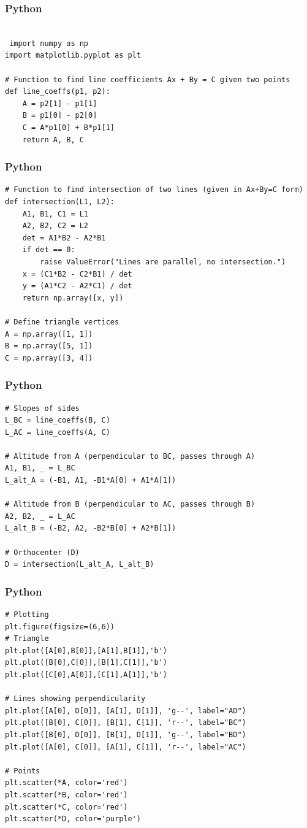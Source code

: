 \documentclass{beamer}
\begin{document}
\begin{frame}[fragile]
    \frametitle{Python}
    \begin{lstlisting}

 import numpy as np
import matplotlib.pyplot as plt

# Function to find line coefficients Ax + By = C given two points
def line_coeffs(p1, p2):
    A = p2[1] - p1[1]
    B = p1[0] - p2[0]
    C = A*p1[0] + B*p1[1]
    return A, B, C
\end{lstlisting}
 
\end{frame}
\begin{frame}[fragile]
    \frametitle{Python}
    \begin{lstlisting}
# Function to find intersection of two lines (given in Ax+By=C form)
def intersection(L1, L2):
    A1, B1, C1 = L1
    A2, B2, C2 = L2
    det = A1*B2 - A2*B1
    if det == 0:
        raise ValueError("Lines are parallel, no intersection.")
    x = (C1*B2 - C2*B1) / det
    y = (A1*C2 - A2*C1) / det
    return np.array([x, y])

# Define triangle vertices
A = np.array([1, 1])
B = np.array([5, 1])
C = np.array([3, 4])
\end{lstlisting}
 
\end{frame}
\begin{frame}[fragile]
    \frametitle{Python}
    \begin{lstlisting}
# Slopes of sides
L_BC = line_coeffs(B, C)
L_AC = line_coeffs(A, C)

# Altitude from A (perpendicular to BC, passes through A)
A1, B1, _ = L_BC
L_alt_A = (-B1, A1, -B1*A[0] + A1*A[1])

# Altitude from B (perpendicular to AC, passes through B)
A2, B2, _ = L_AC
L_alt_B = (-B2, A2, -B2*B[0] + A2*B[1])

# Orthocenter (D)
D = intersection(L_alt_A, L_alt_B)
\end{lstlisting}
 
\end{frame}
\begin{frame}[fragile]
    \frametitle{Python}
    \begin{lstlisting}
# Plotting
plt.figure(figsize=(6,6))
# Triangle
plt.plot([A[0],B[0]],[A[1],B[1]],'b')
plt.plot([B[0],C[0]],[B[1],C[1]],'b')
plt.plot([C[0],A[0]],[C[1],A[1]],'b')

# Lines showing perpendicularity
plt.plot([A[0], D[0]], [A[1], D[1]], 'g--', label="AD")
plt.plot([B[0], C[0]], [B[1], C[1]], 'r--', label="BC")
plt.plot([B[0], D[0]], [B[1], D[1]], 'g--', label="BD")
plt.plot([A[0], C[0]], [A[1], C[1]], 'r--', label="AC")

# Points
plt.scatter(*A, color='red')
plt.scatter(*B, color='red')
plt.scatter(*C, color='red')
plt.scatter(*D, color='purple')
\end{lstlisting}
 
\end{frame}
\end{document}
